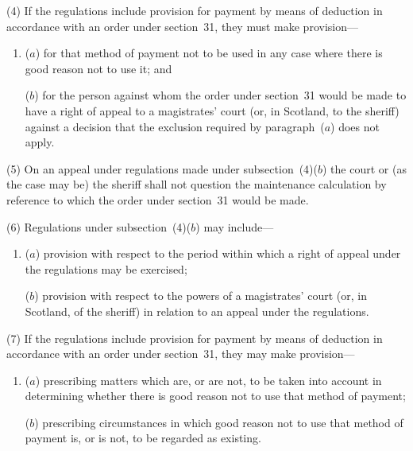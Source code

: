\documentclass[12pt,a4paper]{article}
\begin{document}
(4) If the regulations include provision for payment by means of deduction in accordance with an order under section~31, they must make provision—
\begin{enumerate}\item[]
($a$) for that method of payment not to be used in any case where there is good reason not to use it; and

($b$) for the person against whom the order under section~31 would be made to have a right of appeal to a magistrates' court (or, in Scotland, to the sheriff) against a decision that the exclusion required by paragraph~($a$) does not apply.
\end{enumerate}

\begin{sloppypar}
(5) On an appeal under regulations made under subsection~(4)($b$) the court or (as the case may be) the sheriff shall not question the maintenance calculation by reference to which the order under section~31 would be made.
\end{sloppypar}

(6) Regulations under subsection~(4)($b$) may include—
\begin{enumerate}\item[]
($a$) provision with respect to the period within which a right of appeal under the regulations may be exercised;

($b$) provision with respect to the powers of a magistrates' court (or, in Scotland, of the sheriff) in relation to an appeal under the regulations.
\end{enumerate}

(7) If the regulations include provision for payment by means of deduction in accordance with an order under section~31, they may make provision—
\begin{enumerate}\item[]
($a$) prescribing matters which are, or are not, to be taken into account in determining whether there is good reason not to use that method of payment;

($b$) prescribing circumstances in which good reason not to use that method of payment is, or is not, to be regarded as existing.
\end{enumerate}

\end{document}
